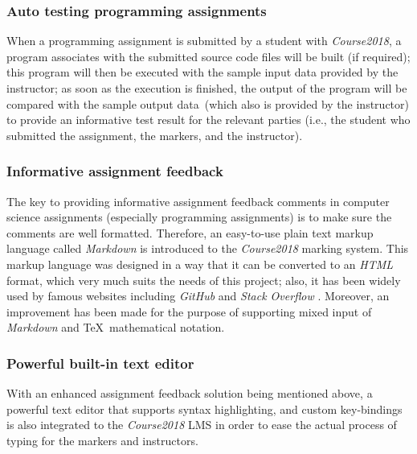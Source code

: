 \subsubsection{Auto testing programming assignments}
When a programming assignment is submitted by a student with \emph{Course2018},
a program associates with the submitted source code files will be built
(if required); this program
will then be executed with the sample input data provided by the instructor;
as soon as the execution is finished, 
the output of the program will be compared with the sample output data~(which
also is provided by the instructor) to
provide an informative test result for the relevant parties (i.e., the student
who submitted the assignment, the markers, and the instructor).

\subsubsection{Informative assignment feedback}
The key to providing informative assignment feedback comments in computer
science assignments (especially programming assignments) is to make sure the
comments are well formatted.
Therefore, an easy-to-use plain text markup language called \emph{Markdown}
is introduced to the \emph{Course2018} marking system. This markup language was
designed in a way that it can be converted to an \emph{HTML} format, which
very much suits the needs of this project;
also, it has been
widely used by famous websites including \emph{GitHub} \cite{gitHubMarkdown}
and \emph{Stack Overflow} \cite{stackOverflowMarkdown}.
Moreover, an improvement has been made for the purpose of supporting mixed
input of \emph{Markdown} and \TeX\ mathematical notation.

\subsubsection{Powerful built-in text editor}
With an enhanced assignment feedback solution being mentioned above, a powerful
text editor that supports syntax highlighting, and custom key-bindings is also
integrated to the \emph{Course2018} LMS in order to ease the actual process of
typing for the markers and instructors.